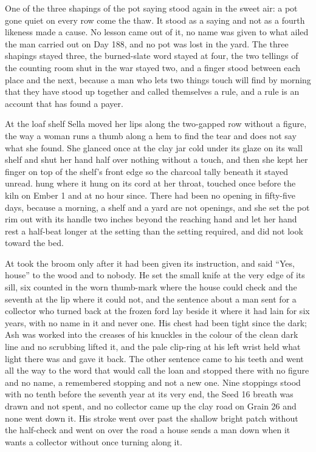 One of the three shapings of the pot saying stood again in the sweet air: a pot gone quiet on every row come the thaw. It stood as a saying and not as a fourth likeness made a cause. No lesson came out of it, no name was given to what ailed the man carried out on Day 188, and no pot was lost in the yard. The three shapings stayed three, the burned-slate word stayed at four, the two tellings of the counting room shut in the war stayed two, and a finger stood between each place and the next, because a man who lets two things touch will find by morning that they have stood up together and called themselves a rule, and a rule is an account that has found a payer.

\scenebreak

At the loaf shelf Sella moved her lips along the two-gapped row without a figure, the way a woman runs a thumb along a hem to find the tear and does not say what she found. She glanced once at the clay jar cold under its glaze on its wall shelf and shut her hand half over nothing without a touch, and then she kept her finger on top of the shelf's front edge so the charcoal tally beneath it stayed unread.  hung where it hung on its cord at her throat, touched once before the kiln on Ember 1 and at no hour since. There had been no opening in fifty-five days, because a morning, a shelf and a yard are not openings, and she set the pot rim out with its handle two inches beyond the reaching hand and let her hand rest a half-beat longer at the setting than the setting required, and did not look toward the bed.

At   took the broom only after it had been given its instruction, and said “Yes, house” to the wood and to nobody. He set the small knife at the very edge of its sill, six counted in the worn thumb-mark where the house could check and the seventh at the lip where it could not, and the sentence about a man sent for a collector who turned back at the frozen ford lay beside it where it had lain for six years, with no name in it and never one. His chest had been tight since the dark; Ash was worked into the creases of his knuckles in the colour of the clean dark line and no scrubbing lifted it, and the pale clip-ring at his left wrist held what light there was and gave it back. The other sentence came to his teeth and went all the way to the word that would call the loan and stopped there with no figure and no name, a remembered stopping and not a new one. Nine stoppings stood with no tenth before the seventh year at its very end, the Seed 16 breath was drawn and not spent, and no collector came up the clay road on Grain 26 and none went down it. His stroke went over  past the shallow bright patch without the half-check and went on over the road a house sends a man down when it wants a collector without once turning along it.

